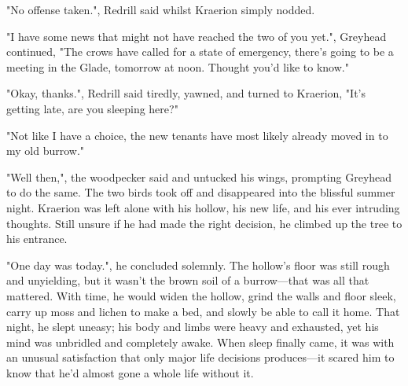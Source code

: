 "No offense taken.", Redrill said whilst Kraerion simply nodded.

"I have some news that might not have reached the two of you yet.", Greyhead continued, "The crows have called for a state of emergency, there's going to be a meeting in the Glade, tomorrow at noon. Thought you'd like to know."

"Okay, thanks.", Redrill said tiredly, yawned, and turned to Kraerion, "It's getting late, are you sleeping here?" 

"Not like I have a choice, the new tenants have most likely already moved in to my old burrow."

"Well then,", the woodpecker said and untucked his wings, prompting Greyhead to do the same. The two birds took off and disappeared into the blissful summer night. Kraerion was left alone with his hollow, his new life, and his ever intruding thoughts. Still unsure if he had made the right decision, he climbed up the tree to his entrance.

"One day was today.", he concluded solemnly. The hollow's floor was still rough and unyielding, but it wasn't the brown soil of a burrow---that was all that mattered. With time, he would widen the hollow, grind the walls and floor sleek, carry up moss and lichen to make a bed, and slowly be able to call it home. That night, he slept uneasy; his body and limbs were heavy and exhausted, yet his mind was unbridled and completely awake. When sleep finally came, it was with an unusual satisfaction that only major life decisions produces---it scared him to know that he'd almost gone a whole life without it.


